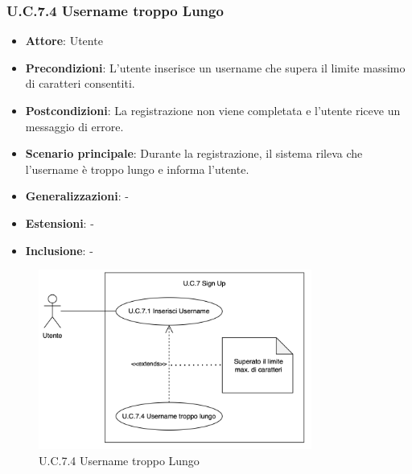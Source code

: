 \subsubsection{U.C.7.4 Username troppo Lungo}
\begin{itemize}
    \item \textbf{Attore}: Utente
    \item \textbf{Precondizioni}: L'utente inserisce un username che supera il limite massimo di caratteri consentiti.
    \item \textbf{Postcondizioni}: La registrazione non viene completata e l'utente riceve un messaggio di errore. 
    \item \textbf{Scenario principale}: Durante la registrazione, il sistema rileva che l'username è troppo lungo e informa l'utente. 
    \item \textbf{Generalizzazioni}: -
    \item \textbf{Estensioni}: -
    \item \textbf{Inclusione}: -
\end{itemize}
\begin{figure}[H]
    \centering
    \includegraphics[width=0.8\textwidth]{img/UC7.4.png}
    \caption{U.C.7.4 Username troppo Lungo}
\end{figure}
\newpage

